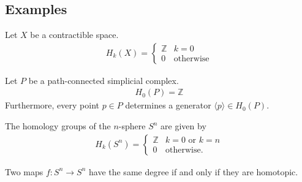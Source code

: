 \subsection{Examples}

    \begin{example}\label{topology:point_homology}
        Let $X$ be a contractible space.
        \begin{gather}
            H_k(X) =
            \begin{cases}
                \mathbb{Z}&k=0\\
                0&\text{otherwise}
            \end{cases}
        \end{gather}
    \end{example}
    \begin{example}
        Let $P$ be a path-connected simplicial complex.
        \begin{gather}
            H_0(P) = \mathbb{Z}
        \end{gather}
        Furthermore, every point $p\in P$ determines a generator $\langle p \rangle\in H_0(P)$.
    \end{example}

    \begin{example}
        The homology groups of the $n$-sphere $S^n$ are given by
        \begin{gather}
            H_k(S^n)=
            \begin{cases}
                \mathbb{Z}&k=0\text{ or }k=n\\
                0&\text{otherwise}.
            \end{cases}
        \end{gather}
    \end{example}

    \begin{property}
        Two maps $f:S^n\rightarrow S^n$ have the same degree if and only if they are homotopic.
    \end{property}


